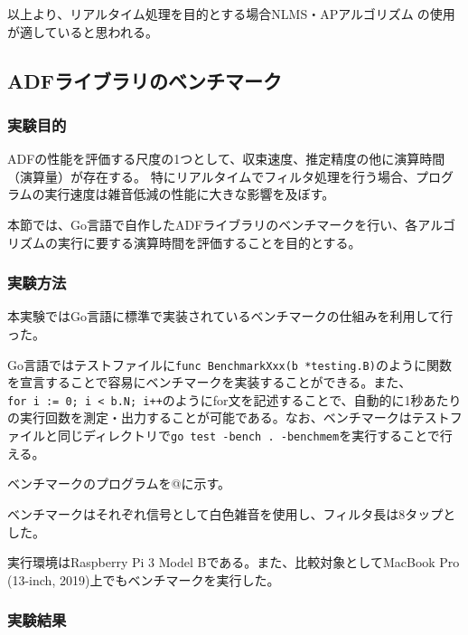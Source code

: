 以上より、リアルタイム処理を目的とする場合NLMS・APアルゴリズムの使用が適していると思われる。

\hypertarget{adfux30e9ux30a4ux30d6ux30e9ux30eaux306eux30d9ux30f3ux30c1ux30deux30fcux30af}{%
\subsection{ADFライブラリのベンチマーク}\label{adfux30e9ux30a4ux30d6ux30e9ux30eaux306eux30d9ux30f3ux30c1ux30deux30fcux30af}}

\hypertarget{ux5b9fux9a13ux76eeux7684-2}{%
\subsubsection{実験目的}\label{ux5b9fux9a13ux76eeux7684-2}}

ADFの性能を評価する尺度の1つとして、収束速度、推定精度の他に演算時間（演算量）が存在する。
特にリアルタイムでフィルタ処理を行う場合、プログラムの実行速度は雑音低減の性能に大きな影響を及ぼす。

本節では、Go言語で自作したADFライブラリのベンチマークを行い、各アルゴリズムの実行に要する演算時間を評価することを目的とする。

\hypertarget{ux5b9fux9a13ux65b9ux6cd5-2}{%
\subsubsection{実験方法}\label{ux5b9fux9a13ux65b9ux6cd5-2}}

本実験ではGo言語に標準で実装されているベンチマークの仕組みを利用して行った。

Go言語ではテストファイルに\texttt{func\ BenchmarkXxx(b\ *testing.B)}のように関数を宣言することで容易にベンチマークを実装することができる。また、\texttt{for\ i\ :=\ 0;\ i\ \textless{}\ b.N;\ i++}のようにfor文を記述することで、自動的に1秒あたりの実行回数を測定・出力することが可能である。なお、ベンチマークはテストファイルと同じディレクトリで\texttt{go\ test\ -bench\ .\ -benchmem}を実行することで行える。

ベンチマークのプログラムを@に示す。

ベンチマークはそれぞれ信号として白色雑音を使用し、フィルタ長は8タップとした。

実行環境はRaspberry Pi 3 Model Bである。また、比較対象としてMacBook Pro
(13-inch, 2019)上でもベンチマークを実行した。

\hypertarget{ux5b9fux9a13ux7d50ux679c-2}{%
\subsubsection{実験結果}\label{ux5b9fux9a13ux7d50ux679c-2}}

